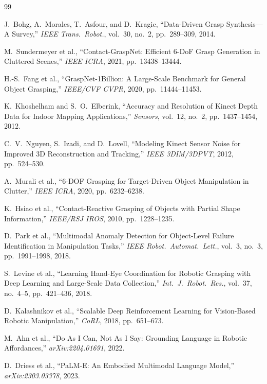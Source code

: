 \documentclass[journal]{IEEEtran}
\begin{document}
\begin{thebibliography}{99}

J.~Bohg, A.~Morales, T.~Asfour, and D.~Kragic,
``Data-Driven Grasp Synthesis---A Survey,''
\emph{IEEE Trans.\ Robot.}, vol.~30, no.~2, pp.~289--309, 2014.

M.~Sundermeyer et al., ``Contact-GraspNet: Efficient 6-DoF Grasp
Generation in Cluttered Scenes,'' \emph{IEEE ICRA}, 2021,
pp.~13438--13444.

H.-S.~Fang et al., ``GraspNet-1Billion: A Large-Scale Benchmark for
General Object Grasping,'' \emph{IEEE/CVF CVPR}, 2020,
pp.~11444--11453.

K.~Khoshelham and S.~O.~Elberink,
``Accuracy and Resolution of Kinect Depth Data for Indoor Mapping
Applications,''
\emph{Sensors}, vol.~12, no.~2, pp.~1437--1454, 2012.

C.~V.~Nguyen, S.~Izadi, and D.~Lovell,
``Modeling Kinect Sensor Noise for Improved 3D Reconstruction and
Tracking,'' \emph{IEEE 3DIM/3DPVT}, 2012, pp.~524--530.

A.~Murali et al., ``6-DOF Grasping for Target-Driven Object
Manipulation in Clutter,'' \emph{IEEE ICRA}, 2020, pp.~6232--6238.

K.~Hsiao et al., ``Contact-Reactive Grasping of Objects with Partial
Shape Information,'' \emph{IEEE/RSJ IROS}, 2010, pp.~1228--1235.

D.~Park et al., ``Multimodal Anomaly Detection for Object-Level
Failure Identification in Manipulation Tasks,''
\emph{IEEE Robot.\ Automat.\ Lett.}, vol.~3, no.~3,
pp.~1991--1998, 2018.

S.~Levine et al., ``Learning Hand-Eye Coordination for Robotic
Grasping with Deep Learning and Large-Scale Data Collection,''
\emph{Int.\ J.\ Robot.\ Res.}, vol.~37, no.~4--5,
pp.~421--436, 2018.

D.~Kalashnikov et al., ``Scalable Deep Reinforcement Learning for
Vision-Based Robotic Manipulation,'' \emph{CoRL}, 2018,
pp.~651--673.

M.~Ahn et al., ``Do As I Can, Not As I Say: Grounding Language in
Robotic Affordances,'' \emph{arXiv:2204.01691}, 2022.

D.~Driess et al., ``PaLM-E: An Embodied Multimodal Language Model,''
\emph{arXiv:2303.03378}, 2023.


\end{thebibliography}
\end{document}
